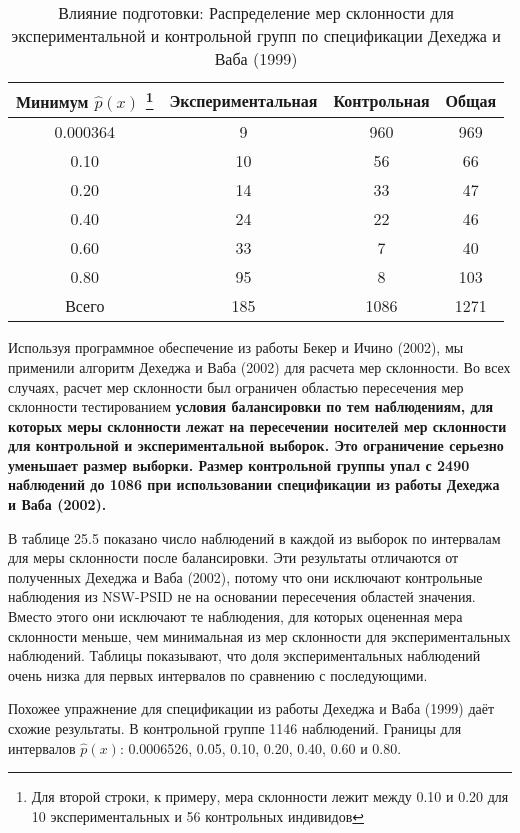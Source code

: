\begin{table}[h]
\caption{Влияние подготовки: Распределение мер склонности для экспериментальной и контрольной групп по спецификации Дехеджа и Ваба (1999)}
\begin{center}
\begin{minipage}{12cm}
\begin{tabular}{cccc}
\hline
\hline
Минимум $\widehat p(x)$ \footnote{Для второй строки, к примеру, мера склонности лежит между 0.10 и 0.20 для 10 экспериментальных и 56 контрольных индивидов} & Экспериментальная & Контрольная &  Общая \\
\hline
0.000364 & 9 & 960 & 969 \\
0.10 & 10 & 56 & 66 \\
0.20 & 14 & 33 & 47 \\
0.40 & 24 & 22 & 46 \\
0.60 & 33 & 7 & 40 \\
0.80 & 95 & 8 & 103 \\
Всего & 185 & 1086 & 1271 \\
\hline
\hline
\end{tabular}
\end{minipage}
\end{center}
\end{table}
Используя программное обеспечение из работы Бекер и Ичино (2002), мы применили алгоритм Дехеджа и Ваба (2002) для расчета мер склонности. Во всех случаях, расчет мер склонности был ограничен областью пересечения мер склонности тестированием \bfseries условия балансировки \mdseries по тем наблюдениям, для которых меры склонности лежат на пересечении носителей мер склонности для контрольной и экспериментальной выборок. Это ограничение серьезно уменьшает размер выборки. Размер контрольной группы упал с 2490 наблюдений до 1086 при использовании спецификации из работы Дехеджа и Ваба (2002). 

В таблице 25.5 показано число наблюдений в каждой из выборок по интервалам для меры склонности после балансировки. Эти результаты отличаются от полученных Дехеджа и Ваба (2002), потому что они исключают контрольные наблюдения из NSW-PSID не на основании пересечения областей значения. Вместо этого они исключают те наблюдения, для которых оцененная мера склонности меньше, чем минимальная из мер склонности для экспериментальных наблюдений. Таблицы показывают, что доля экспериментальных наблюдений очень низка для первых интервалов по сравнению с последующими. 

Похожее упражнение для спецификации из работы Дехеджа и Ваба (1999) даёт схожие результаты. В контрольной группе 1146 наблюдений. Границы для интервалов $\widehat p(x)$: 0.0006526, 0.05, 0.10, 0.20, 0.40, 0.60 и 0.80. 

